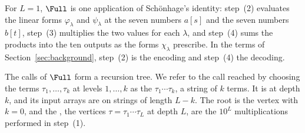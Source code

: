For $L=1$, $\Full$ is one application of Sch\"onhage's identity: step~(2) evaluates the linear forms $\varphi_\lambda$ and $\psi_\lambda$ at the seven numbers $a[s]$ and the seven numbers $b[t]$, step~(3) multiplies the two values for each $\lambda$, and step~(4) sums the products into the ten outputs as the forms $\chi_\lambda$ prescribe. In the terms of Section~\ref{sec:background}, step~(2) is the encoding and step~(4) the decoding.

The calls of $\Full$ form a recursion tree. We refer to the call reached by choosing the terms $\tau_1,\dots,\tau_k$ at levels $1,\dots,k$ as the  $\tau_1\cdots\tau_k$, a string of $k$ terms. It is at depth $k$, and its input arrays are on strings of length $L-k$. The root is the vertex with $k=0$, and the , the vertices $\tau=\tau_1\cdots\tau_L$ at depth $L$, are the $10^L$ multiplications performed in step~(1).

